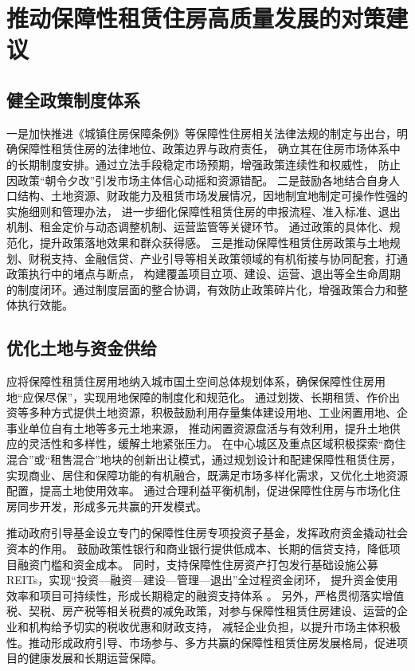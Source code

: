 \section{推动保障性租赁住房高质量发展的对策建议}
\subsection{健全政策制度体系}
一是加快推进《城镇住房保障条例》等保障性住房相关法律法规的制定与出台，明确保障性租赁住房的法律地位、政策边界与政府责任，
确立其在住房市场体系中的长期制度安排。通过立法手段稳定市场预期，增强政策连续性和权威性，
防止因政策“朝令夕改”引发市场主体信心动摇和资源错配。
二是鼓励各地结合自身人口结构、土地资源、财政能力及租赁市场发展情况，因地制宜地制定可操作性强的实施细则和管理办法，
进一步细化保障性租赁住房的申报流程、准入标准、退出机制、租金定价与动态调整机制、运营监管等关键环节。
通过政策的具体化、规范化，提升政策落地效果和群众获得感。
三是推动保障性租赁住房政策与土地规划、财税支持、金融信贷、产业引导等相关政策领域的有机衔接与协同配套，打通政策执行中的堵点与断点，
构建覆盖项目立项、建设、运营、退出等全生命周期的制度闭环。通过制度层面的整合协调，有效防止政策碎片化，增强政策合力和整体执行效能。

\subsection{优化土地与资金供给}
应将保障性租赁住房用地纳入城市国土空间总体规划体系，确保保障性住房用地“应保尽保”，实现用地保障的制度化和规范化。
通过划拨、长期租赁、作价出资等多种方式提供土地资源，积极鼓励利用存量集体建设用地、工业闲置用地、企事业单位自有土地等多元土地来源，
推动闲置资源盘活与有效利用，提升土地供应的灵活性和多样性，缓解土地紧张压力。
在中心城区及重点区域积极探索“商住混合”或“租售混合”地块的创新出让模式，通过规划设计和配建保障性租赁住房，
实现商业、居住和保障功能的有机融合，既满足市场多样化需求，又优化土地资源配置，提高土地使用效率。
通过合理利益平衡机制，促进保障性住房与市场化住房同步开发，形成多元共赢的开发模式。

推动政府引导基金设立专门的保障性住房专项投资子基金，发挥政府资金撬动社会资本的作用。
鼓励政策性银行和商业银行提供低成本、长期的信贷支持，降低项目融资门槛和资金成本。
同时，支持保障性住房资产打包发行基础设施公募REITs，实现“投资—融资—建设—管理—退出”全过程资金闭环，
提升资金使用效率和项目可持续性，形成长期稳定的融资支持体系 \cite{RN9} 。
另外，严格贯彻落实增值税、契税、房产税等相关税费的减免政策，对参与保障性租赁住房建设、运营的企业和机构给予切实的税收优惠和财政支持，
减轻企业负担，以提升市场主体积极性。推动形成政府引导、市场参与、多方共赢的保障性租赁住房发展格局，促进项目的健康发展和长期运营保障。

